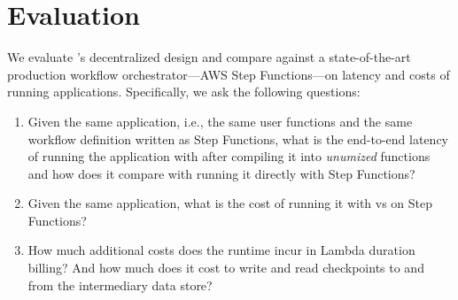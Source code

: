 \section{Evaluation}\label{sec:eval}

We evaluate \name{}'s decentralized design and compare against a
state-of-the-art production workflow orchestrator---AWS Step Functions---on
latency and costs of running applications. Specifically, we ask the following
questions:

\begin{enumerate}

    \item Given the same application, i.e., the same user functions and the
    same workflow definition written as Step Functions, what is the end-to-end
    latency of running the application with \name{} after compiling it into
    \textit{unumized} functions and how does it compare with running it
    directly with Step Functions?

    \item Given the same application, what is the cost of running it with
    \name{} vs on Step Functions?

    \item How much additional costs does the \name{} runtime incur in Lambda
    duration billing? And how much does it cost to write and read checkpoints
    to and from the intermediary data store?

\end{enumerate}






